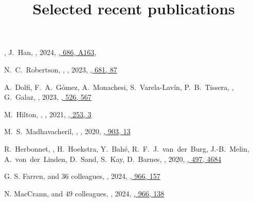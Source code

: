 \title{Selected recent publications}


\noindent



\begin{etaremune}

\item
\myself, J.~Han,
,
2024, \href{https://arxiv.org/abs/2312.12529}{\aap, 686, A163},
   
\item
N.~C.~Robertson, \myself, 
,
2023, \href{https://ui.adsabs.harvard.edu/abs/2024A&A...681A..87R/abstract}{\aap, 681, 87}

\item
A.~Dolfi, F.~A.~G\'omez, A.~Monachesi, S.~Varela-Lav\'in, P.~B.~Tissera, \myself, G.~Galaz, 
,
2023, \href{https://ui.adsabs.harvard.edu/abs/2023MNRAS.526..567D/abstract}{\mnras, 526, 567}

\item
M.~Hilton, \myself, 
,
2021, \href{https://ui.adsabs.harvard.edu/abs/2021ApJS..253....3H/abstract}{\apjs, 253, 3}

\item
M.~S.~Madhavacheril, \myself, 
,
2020, \href{https://ui.adsabs.harvard.edu/abs/2020ApJ...903L..13M/abstract}{\apjl, 903, 13}

\item
R.~Herbonnet, \myself, H.~Hoekstra, Y.~Bah\'e, R.~F.~J.~van~der~Burg, 
J.-B.~Melin, A.~von~der~Linden, D.~Sand, S.~Kay, D.~Barnes,
,
2020, \href{https://ui.adsabs.harvard.edu/abs/2020MNRAS.497.4684H/abstract}{\mnras, 497, 4684}
\item
G. S. Farren, and 36 colleagues,
,
2024, \href{https://ui.adsabs.harvard.edu/abs/2024ApJ...966..157F}{\apj, 966, 157}

\item
N. MacCrann, and 49 colleagues,
,
2024, \href{https://ui.adsabs.harvard.edu/abs/2024ApJ...966..138M}{\apj, 966, 138}


\end{etaremune}
